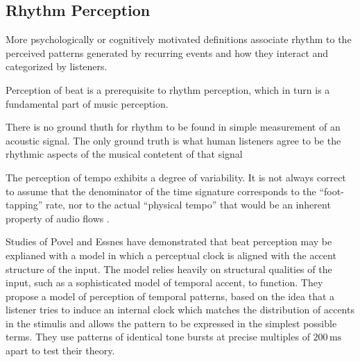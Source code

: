 \documentclass{scrartcl}
\begin{document}





\subsection{Rhythm Perception}

More psychologically or cognitively motivated definitions associate rhythm to the perceived patterns generated by recurring events and how they interact and categorized by listeners. 

Perception of beat is a prerequisite to rhythm perception, which in turn is a fundamental part of music perception.


There is no ground thuth for rhythm to be found in simple measurement of an acoustic signal. The only ground truth is what human listeners agree to be the rhythmic aspects of the musical contetent of that signal

The perception of tempo exhibits a degree of variability. It is not always correct to assume that the denominator of the time signature corresponds to the ``foot-tapping'' rate, nor to the actual ``physical tempo'' that would be an inherent property of audio flows \cite{Drake1999}.

Studies of Povel and Essnes \cite{Povel1985} have demonstrated that beat perception may be explianed with a model in which a perceptual clock is aligned with the accent structure of the input. The model relies heavily on structural qualities of the input, such as a sophisticated model of temporal accent, to function. They propose a model of perception of temporal patterns, based on the idea that a listener tries to induce an internal clock which matches the distribution of accents in the stimulis and allows the pattern to be expressed in the simplest possible terms. They use patterns of identical tone bursts at precise multiples of $200\, \text{ms}$ apart to test their theory. 
\end{document}
